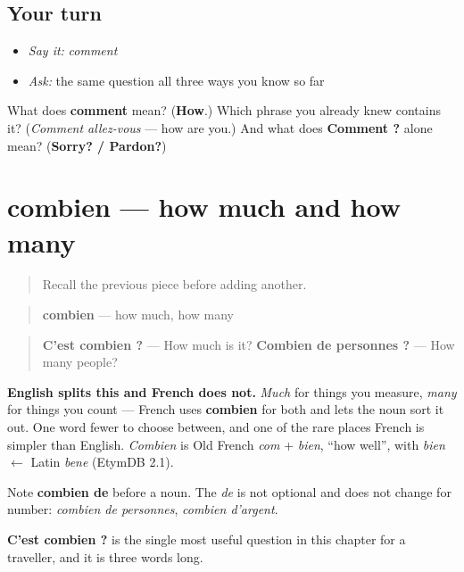 \subsection*{Your turn}
\begin{itemize}
\raggedright
  \item \emph{Say it:} \emph{comment}
  \item \emph{Ask:} the same question all three ways you know so far
\end{itemize}

\begin{tcolorbox}[breakable,colback=teal!4,colframe=teal!35!black,title={Before you move on}]
What does \textbf{comment} mean? (\textbf{How}.) Which phrase you already knew contains it? (\emph{Comment allez-vous} — how are you.) And what does \textbf{Comment ?} alone mean? (\textbf{Sorry? / Pardon?})
\end{tcolorbox}
\section[combien]{combien — how much and how many}

\label{lesson:FR-C32-combien}



\begin{quote}
Recall the previous piece before adding another.
\end{quote}

\begin{cousinweb}
\begin{quote}
\textbf{combien} — how much, how many
\end{quote}

\begin{quote}
\textbf{C'est combien ?} — How much is it? \textbf{Combien de personnes ?} — How many people?
\end{quote}

\textbf{English splits this and French does not.} \emph{Much} for things you measure, \emph{many} for things you count — French uses \textbf{combien} for both and lets the noun sort it out. One word fewer to choose between, and one of the rare places French is simpler than English. \emph{Combien} is Old French \emph{com} + \emph{bien}, \textquotedblleft{}how well\textquotedblright{}, with \emph{bien} $\leftarrow$ Latin \emph{bene} (EtymDB 2.1).

Note \textbf{combien de} before a noun. The \emph{de} is not optional and does not change for number: \emph{combien de personnes}, \emph{combien d'argent}.

\textbf{C'est combien ?} is the single most useful question in this chapter for a traveller, and it is three words long.
\end{cousinweb}

